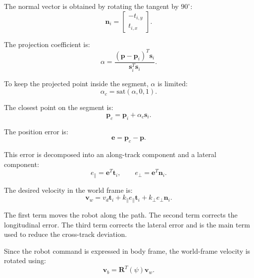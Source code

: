 The normal vector is obtained by rotating the tangent by \(90^\circ\):
\begin{equation}
    \mathbf{n}_i
    =
    \begin{bmatrix}
        -t_{i,y} \\
        t_{i,x}
    \end{bmatrix}.
\end{equation}

The projection coefficient is:
\begin{equation}
    \alpha
    =
    \frac{
        (\mathbf{p} - \mathbf{p}_i)^T \mathbf{s}_i
    }{
        \mathbf{s}_i^T \mathbf{s}_i
    }.
\end{equation}

To keep the projected point inside the segment, \(\alpha\) is limited:
\begin{equation}
    \alpha_c
    =
    \mathrm{sat}(\alpha,0,1).
\end{equation}

The closest point on the segment is:
\begin{equation}
    \mathbf{p}_{c}
    =
    \mathbf{p}_i
    +
    \alpha_c \mathbf{s}_i.
\end{equation}

The position error is:
\begin{equation}
    \mathbf{e}
    =
    \mathbf{p}_{c}
    -
    \mathbf{p}.
\end{equation}

This error is decomposed into an along-track component and a lateral component:
\begin{equation}
    e_{\parallel}
    =
    \mathbf{e}^{T}\mathbf{t}_i,
    \qquad
    e_{\perp}
    =
    \mathbf{e}^{T}\mathbf{n}_i.
\end{equation}

The desired velocity in the world frame is:
\begin{equation}
    \mathbf{v}_{w}
    =
    v_d \mathbf{t}_i
    +
    k_{\parallel} e_{\parallel} \mathbf{t}_i
    +
    k_{\perp} e_{\perp} \mathbf{n}_i.
\end{equation}

The first term moves the robot along the path. The second term corrects the
longitudinal error. The third term corrects the lateral error and is the main
term used to reduce the cross-track deviation.

Since the robot command is expressed in body frame, the world-frame velocity is
rotated using:
\begin{equation}
    \mathbf{v}_{b}
    =
    \mathbf{R}^{T}(\psi)
    \mathbf{v}_{w}.
\end{equation}

